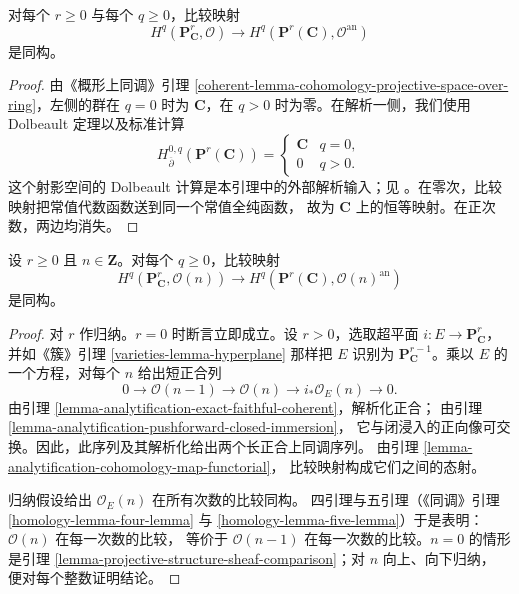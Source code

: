 \begin{lemma}
\label{lemma-projective-structure-sheaf-comparison}
对每个 $r \geq 0$ 与每个 $q \geq 0$，比较映射
$$
H^q(\mathbf P^r_{\mathbf C},\mathcal O)
\longrightarrow
H^q(\mathbf P^r(\mathbf C),\mathcal O^{\mathrm{an}})
$$
是同构。
\end{lemma}

\begin{proof}
由《概形上同调》引理
\ref{coherent-lemma-cohomology-projective-space-over-ring}，左侧的群在 $q=0$
时为 $\mathbf C$，在 $q>0$ 时为零。在解析一侧，我们使用 Dolbeault 定理以及标准计算
$$
H^{0,q}_{\overline\partial}(\mathbf P^r(\mathbf C))=
\begin{cases}
\mathbf C & q=0,\\
0 & q>0.
\end{cases}
$$
这个射影空间的 Dolbeault 计算是本引理中的外部解析输入；见
\cite[\S 2，第 13 号]{GAGA}。在零次，比较映射把常值代数函数送到同一个常值全纯函数，
故为 $\mathbf C$ 上的恒等映射。在正次数，两边均消失。
\end{proof}

\begin{lemma}
\label{lemma-projective-twist-comparison}
设 $r \geq 0$ 且 $n \in \mathbf Z$。对每个 $q \geq 0$，比较映射
$$
H^q(\mathbf P^r_{\mathbf C},\mathcal O(n))
\longrightarrow
H^q(\mathbf P^r(\mathbf C),\mathcal O(n)^{\mathrm{an}})
$$
是同构。
\end{lemma}

\begin{proof}
对 $r$ 作归纳。$r=0$ 时断言立即成立。设 $r>0$，选取超平面
$i:E\longrightarrow\mathbf P^r_{\mathbf C}$，并如《簇》引理
\ref{varieties-lemma-hyperplane} 那样把 $E$ 识别为
$\mathbf P^{r-1}_{\mathbf C}$。乘以 $E$ 的一个方程，对每个 $n$ 给出短正合列
$$
0\longrightarrow\mathcal O(n-1)\longrightarrow\mathcal O(n)
\longrightarrow i_*\mathcal O_E(n)\longrightarrow0.
$$
由引理 \ref{lemma-analytification-exact-faithful-coherent}，解析化正合；
由引理 \ref{lemma-analytification-pushforward-closed-immersion}，
它与闭浸入的正向像可交换。因此，此序列及其解析化给出两个长正合上同调序列。
由引理 \ref{lemma-analytification-cohomology-map-functorial}，
比较映射构成它们之间的态射。

归纳假设给出 $\mathcal O_E(n)$ 在所有次数的比较同构。
四引理与五引理（《同调》引理 \ref{homology-lemma-four-lemma} 与
\ref{homology-lemma-five-lemma}）于是表明：$\mathcal O(n)$ 在每一次数的比较，
等价于 $\mathcal O(n-1)$ 在每一次数的比较。$n=0$ 的情形是引理
\ref{lemma-projective-structure-sheaf-comparison}；对 $n$ 向上、向下归纳，
便对每个整数证明结论。
\end{proof}

